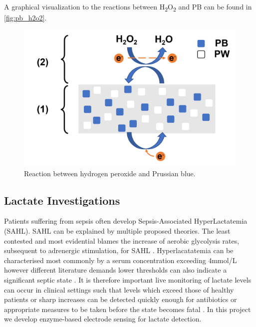 \noindent A graphical visualization to the reactions between H\textsubscript{2}O\textsubscript{2} and PB can be found in \autoref{fig:pb_h2o2}.
\begin{figure}[H]
    \centering
    \includegraphics[width=.5\textwidth]{img/pb_h2o2.png}
    \caption{Reaction between hydrogen peroxide and Prussian blue.}
    \label{fig:pb_h2o2}
\end{figure}

\subsection{Lactate Investigations}
Patients suffering from sepsis often develop Sepsis-Associated HyperLactatemia (SAHL). SAHL can be explained by multiple proposed theories. The least contested and most evidential blames the increase of aerobic glycolysis rates, subsequent to adrenergic stimulation, for SAHL \cite{garcia2014sepsis}.
Hyperlacatatemia can be characterised most commonly by a serum concentration exceeding 4mmol/L however different literature demands lower thresholds can also indicate a significant septic state \cite{singer2014ed}. It is therefore important live monitoring of lactate levels can occur in clinical settings such that levels which exceed those of healthy patients or sharp increases can be detected quickly enough for antibiotics or appropriate measures to be taken before the state becomes fatal \cite{gyawali2019sepsis}.
In this project we develop enzyme-based electrode sensing for lactate detection.
